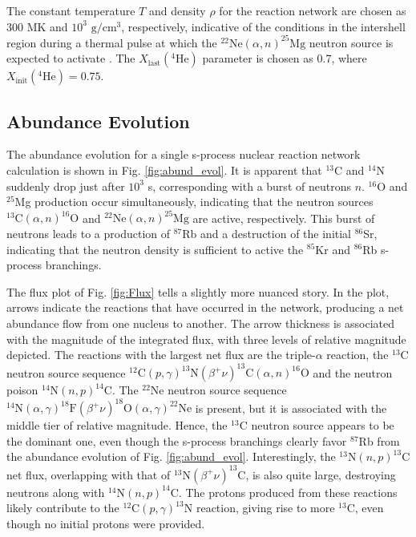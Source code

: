 The constant temperature $T$ and density $\rho$ for the reaction network are chosen as 300 MK and $10^{3}$ $\mathrm{g}/\mathrm{cm}^{3}$, respectively, indicative of the conditions in the intershell region during a thermal pulse at which the $^{22}\mathrm{Ne}(\alpha,n)^{25}\mathrm{Mg}$ neutron source is expected to activate \cite{Habing2004}. The $X_{\mathrm{last}}(^{4}\mathrm{He})$ parameter is chosen as 0.7, where $X_{\mathrm{init}}(^{4}\mathrm{He}) = 0.75$.

\subsection{Abundance Evolution} \label{subsec:abund_evol}


The abundance evolution for a single s-process nuclear reaction network calculation is shown in Fig. \ref{fig:abund_evol}. It is apparent that $^{13}$C and $^{14}$N suddenly drop just after $10^{3}$ s, corresponding with a burst of neutrons $n$. $^{16}$O and $^{25}$Mg production occur simultaneously, indicating that the neutron sources $^{13}\mathrm{C}(\alpha,n)^{16}\mathrm{O}$ and $^{22}\mathrm{Ne}(\alpha,n)^{25}\mathrm{Mg}$ are active, respectively. This burst of neutrons leads to a production of $^{87}$Rb and a destruction of the initial $^{86}$Sr, indicating that the neutron density is sufficient to active the $^{85}$Kr and $^{86}$Rb s-process branchings.

The flux plot of Fig. \ref{fig:Flux} tells a slightly more nuanced story. In the plot, arrows indicate the reactions that have occurred in the network, producing a net abundance flow from one nucleus to another. The arrow thickness is associated with the magnitude of the integrated flux, with three levels of relative magnitude depicted. The reactions with the largest net flux are the triple-$\alpha$ reaction, the $^{13}$C neutron source sequence $^{12}\mathrm{C}(p,\gamma)^{13}\mathrm{N}(\beta^{+}\nu)^{13}\mathrm{C}(\alpha,n)^{16}\mathrm{O}$ and the neutron poison $^{14}\mathrm{N}(n,p)^{14}\mathrm{C}$. The $^{22}$Ne neutron source sequence $^{14}\mathrm{N}(\alpha,\gamma)^{18}\mathrm{F}(\beta^{+}\nu)^{18}\mathrm{O}(\alpha,\gamma)^{22}\mathrm{Ne}$ is present, but it is associated with the middle tier of relative magnitude. Hence, the $^{13}$C neutron source appears to be the dominant one, even though the s-process branchings clearly favor $^{87}$Rb from the abundance evolution of Fig. \ref{fig:abund_evol}. Interestingly, the $^{13}\mathrm{N}(n,p)^{13}\mathrm{C}$ net flux, overlapping with that of $^{13}\mathrm{N}(\beta^{+}\nu)^{13}\mathrm{C}$, is also quite large, destroying neutrons along with $^{14}\mathrm{N}(n,p)^{14}\mathrm{C}$. The protons produced from these reactions likely contribute to the $^{12}\mathrm{C}(p,\gamma)^{13}\mathrm{N}$ reaction, giving rise to more $^{13}$C, even though no initial protons were provided.


